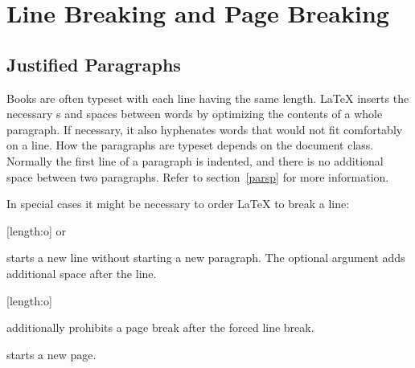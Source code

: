 \section{Line Breaking and Page Breaking}

\subsection{Justified Paragraphs}

Books are often typeset with each line having the same length.
\LaTeX{} inserts the necessary s and spaces between words
by optimizing the contents of a whole paragraph. If necessary, it
also hyphenates words that would not fit comfortably on a line.
How the paragraphs are typeset depends on the document class.
Normally the first line of a paragraph is indented, and there is no
additional space between two paragraphs. Refer to section~\ref{parsp}
for more information.

In special cases it might be necessary to order \LaTeX{} to break a
line:
\begin{lscommand}
\ci*{\bs}[length:o] or 
\end{lscommand}
starts a new line without starting a new paragraph. The optional 
argument adds additional space after the line. 

\begin{lscommand}
\ci*{\bs*}[length:o]
\end{lscommand}
additionally prohibits a page break after the forced line break.

\begin{lscommand}
\end{lscommand}
starts a new page.

